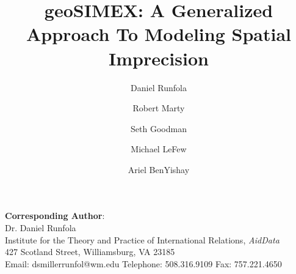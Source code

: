 


\author[1]{Daniel Runfola}
\author[1]{Robert Marty}
\author[1]{Seth Goodman}
\author[1]{Michael LeFew}
\author[2]{Ariel BenYishay}
\renewcommand\Authands{ and }

\title{geoSIMEX: A Generalized Approach To Modeling Spatial Imprecision}



\usepackage{Sweave}




\maketitle 
\begin{flushleft}
\textbf{Corresponding Author}:\\
Dr. Daniel Runfola\\
Institute for the Theory and Practice of International Relations, \emph{AidData}\\
427 Scotland Street, Williamsburg, VA 23185\\
Email: dsmillerrunfol@wm.edu
Telephone: 508.316.9109
Fax: 757.221.4650
\end{flushleft}

\newpage

\doublespacing


